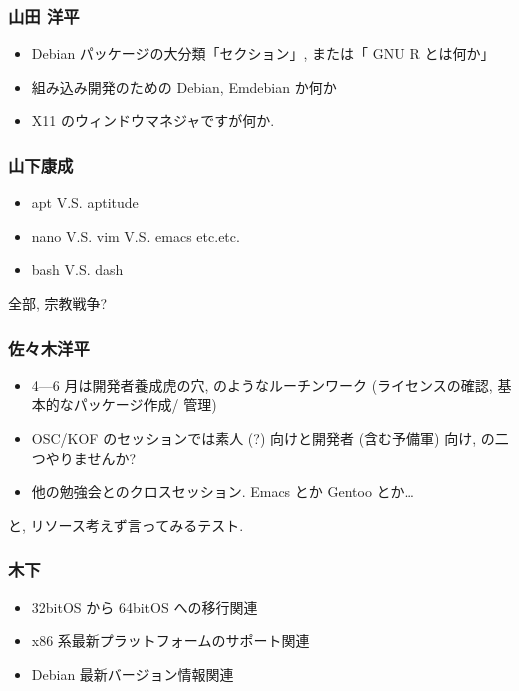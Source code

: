 \documentclass[cjk,dvipdfmx,12pt,%
hyperref={bookmarks=true,bookmarksnumbered=true,bookmarksopen=false,%
colorlinks=false,%
pdftitle={第 42 回 関西 Debian 勉強会},%
pdfauthor={倉敷・のがた・佐々木},%
pdfsubject={資料},%
}]{beamer}
\begin{document}
\begin{frame}[fragile]
\frametitle{ 山田 洋平 }

\begin{itemize}
\item Debian パッケージの大分類「セクション」, または「 GNU R とは何か」
\item 組み込み開発のための Debian, Emdebian か何か
\item X11 のウィンドウマネジャですが何か.
\end{itemize}

\end{frame}

\begin{frame}[fragile]
\frametitle{ 山下康成 }

\begin{itemize}
\item apt V.S. aptitude
\item nano V.S. vim V.S. emacs etc.etc.
\item bash V.S. dash
\end{itemize}

全部, 宗教戦争?

\end{frame}

\begin{frame}[fragile]
\frametitle{ 佐々木洋平 }

\begin{itemize}
\item 4---6 月は開発者養成虎の穴, のようなルーチンワーク (ライセンスの確認, 基本的なパッケージ作成/ 管理)
\item OSC/KOF のセッションでは素人 (?) 向けと開発者 (含む予備軍) 向け, の二つやりませんか?
\item 他の勉強会とのクロスセッション. Emacs とか Gentoo とか\dots{}
\end{itemize}

と, リソース考えず言ってみるテスト.

\end{frame}

\begin{frame}[fragile]
\frametitle{ 木下 }

\begin{itemize}
\item 32bitOS から 64bitOS への移行関連
\item x86 系最新プラットフォームのサポート関連
\item Debian 最新バージョン情報関連
\end{itemize}

\end{frame}
\end{document}
